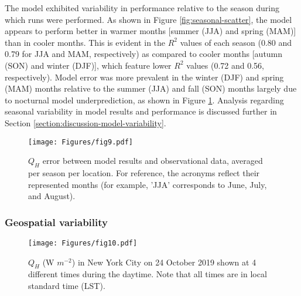 The model exhibited variability in performance relative to the season during which runs were performed.  As shown in Figure \ref{fig:seasonal-scatter}, the model appears to perform better in warmer months [summer (JJA) and spring (MAM)] than in cooler months. This is evident in the $R^2$ values of each season (0.80 and 0.79 for JJA and MAM, respectively) as compared to cooler months [autumn (SON) and winter (DJF)], which feature lower $R^2$ values (0.72 and 0.56, respectively). Model error was more prevalent in the winter (DJF) and spring (MAM) months relative to the summer (JJA) and fall (SON) months largely due to nocturnal model underprediction,  as shown in Figure \ref{fig:seasonal-error}.  Analysis regarding seasonal variability in model results and performance is discussed further in Section \ref{section:discussion-model-variability}.

\begin{figure}[ht!]
    \centering
        \texttt{[image: Figures/fig9.pdf]}
    \caption{$Q_H$ error between model results and observational data, averaged per season per location. For reference, the acronyms reflect their represented months (for example, 'JJA' corresponds to June, July, and August).}
    \label{fig:seasonal-error}
\end{figure}

\FloatBarrier

\subsubsection{Geospatial variability} \label{section:results-geospatial-variability}
\begin{figure}[ht!]
    \centering
    \texttt{[image: Figures/fig10.pdf]}
    \caption{$Q_H$ (W $m^{-2}$) in New York City on 24 October 2019 shown at 4 different times during the daytime. Note that all times are in local standard time (LST).}
    \label{fig:q_h_spatial}
\end{figure}

